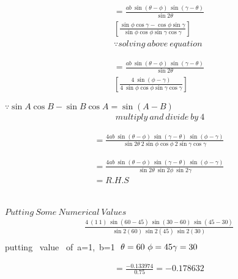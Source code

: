 \documentclass[journal,12pt,twocolumn]{IEEEtran}
\begin{document}
\begin{multline}
=\frac{ab~\sin(\theta-\phi)~\sin(\gamma-\theta)}{ \sin2\theta}\\\left[\frac{\sin\phi\cos\gamma-\cos\phi\sin\gamma}{\sin\phi\cos\phi\sin\gamma\cos\gamma}
\right]\\
\because solving ~above~equation 
\end{multline}

\begin{multline}
=\frac{ab~\sin(\theta-\phi)~\sin(\gamma-\theta)}{ \sin2\theta}\\\left[\frac{4~\sin(\phi-\gamma)}{4~\sin\phi\cos\phi\sin\gamma\cos\gamma}
\right]
\end{multline}

$\because \sin A\cos B - \sin B\cos A=\sin(A-B)$
\begin{align*}
~multiply ~and ~divide ~by ~4
\end{align*}

\begin{multline}
=\frac{4ab~\sin(\theta-\phi)~\sin(\gamma-\theta)~\sin(\phi-\gamma)}{ \sin2\theta~2\sin\phi\cos\phi~2\sin\gamma\cos\gamma}
\end{multline}

\begin{multline}
=\frac{4ab~\sin(\theta-\phi)~\sin(\gamma-\theta)~\sin(\phi-\gamma)}{ \sin2\theta~\sin2\phi~\sin2\gamma} \\= R.H.S
\end{multline}
\\\\
$Putting ~Some ~Numerical~ Values$
\begin{multline}
\frac{4~(1~1)~\sin(60-45)~\sin(30-60)~\sin(45-30)}{ \sin2(60)~\sin2(45)~\sin2(30)}\\
\end{multline}
putting~ value~ of~a=1,~b=1 $~\theta=60~\phi=45 \\ \gamma=30$

\begin{multline}
=\frac{-0.133974}{0.75}=-0.178632\\
\end{multline}
\end{document}
